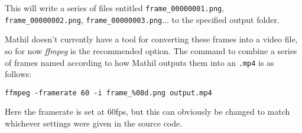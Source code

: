 This will write a series of files entitled \verb|frame_00000001.png|, \verb|frame_00000002.png|, \verb|frame_00000003.png|... to the specified output folder.

Mathil doesn't currently have a tool for converting these frames into a video file, so for now \emph{ffmpeg} is the recommended option. The command to combine a series of frames named according to how Mathil outputs them into an \verb|.mp4| is as follows:

\begin{lstlisting}
ffmpeg -framerate 60 -i frame_%08d.png output.mp4
\end{lstlisting}

Here the framerate is set at 60fps, but this can obviously be changed to match whichever settings were given in the source code.
